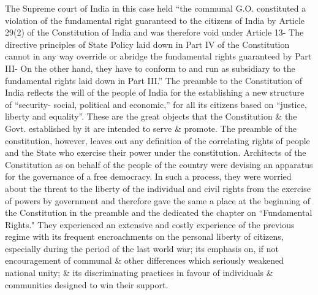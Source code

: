 \begin{multicols}{2}
\noi
The Supreme court of India in this case held “the communal G.O. constituted a violation of the fundamental right guaranteed to the citizens of India by Article 29(2) of the Constitution of India and was therefore void under Article 13- The directive principles of State Policy laid down in Part IV of the Constitution cannot in any way override or abridge the fundamental rights guaranteed by Part III- On the other hand, they have to conform to and run as subsidiary to the fundamental rights laid down in Part III.” The preamble to the Constitution of India reflects the will of the people of India for the establishing a new structure of “security- social, political and economic,” for all its citizens based on “justice, liberty and equality”. These are the great objects that the Constitution \& the Govt. established by it are intended to serve \& promote. The preamble of the constitution, however, leaves out any definition of the correlating rights of people and the State who exercise their power under the constitution. Architects of the Constitution as on behalf of the people of the country were devising an apparatus for the governance of a free democracy. In such a process, they were worried about the threat to the liberty of the individual and civil rights from the exercise of powers by government and therefore gave the same a place at the beginning of the Constitution in the preamble and the dedicated the chapter on “Fundamental Rights." They experienced an extensive and costly experience of the previous regime with its frequent encroachments on the personal liberty of citizens, especially during the period of the last world war; its emphasis on, if not encouragement of communal \& other differences which seriously weakened national unity; \& its discriminating practices in favour of individuals \& communities designed to win their support.


\end{multicols}

